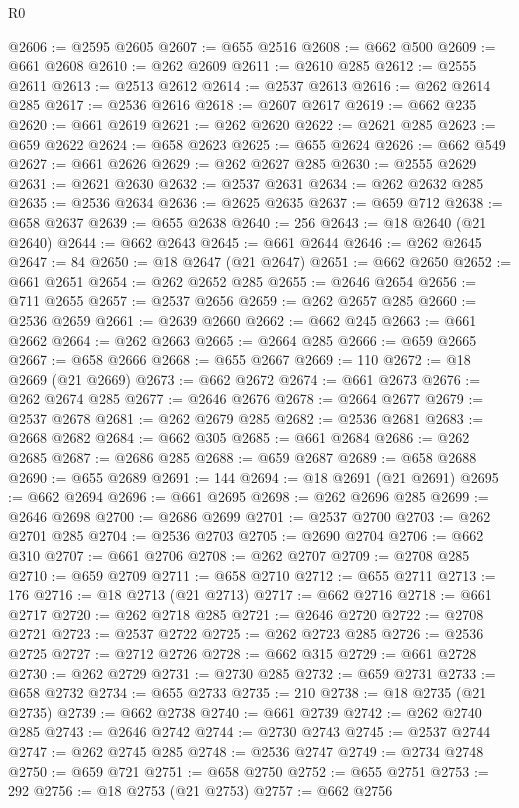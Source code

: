 \begin{lexlean}{R0}
\begin{coremodule}
@2606 := @2595 @2605
@2607 := @655 @2516
@2608 := @662 @500
@2609 := @661 @2608
@2610 := @262 @2609
@2611 := @2610 @285
@2612 := @2555 @2611
@2613 := @2513 @2612
@2614 := @2537 @2613
@2616 := @262 @2614 @285
@2617 := @2536 @2616
@2618 := @2607 @2617
@2619 := @662 @235
@2620 := @661 @2619
@2621 := @262 @2620
@2622 := @2621 @285
@2623 := @659 @2622
@2624 := @658 @2623
@2625 := @655 @2624
@2626 := @662 @549
@2627 := @661 @2626
@2629 := @262 @2627 @285
@2630 := @2555 @2629
@2631 := @2621 @2630
@2632 := @2537 @2631
@2634 := @262 @2632 @285
@2635 := @2536 @2634
@2636 := @2625 @2635
@2637 := @659 @712
@2638 := @658 @2637
@2639 := @655 @2638
@2640 := 256
@2643 := @18 @2640 (@21 @2640)
@2644 := @662 @2643
@2645 := @661 @2644
@2646 := @262 @2645
@2647 := 84
@2650 := @18 @2647 (@21 @2647)
@2651 := @662 @2650
@2652 := @661 @2651
@2654 := @262 @2652 @285
@2655 := @2646 @2654
@2656 := @711 @2655
@2657 := @2537 @2656
@2659 := @262 @2657 @285
@2660 := @2536 @2659
@2661 := @2639 @2660
@2662 := @662 @245
@2663 := @661 @2662
@2664 := @262 @2663
@2665 := @2664 @285
@2666 := @659 @2665
@2667 := @658 @2666
@2668 := @655 @2667
@2669 := 110
@2672 := @18 @2669 (@21 @2669)
@2673 := @662 @2672
@2674 := @661 @2673
@2676 := @262 @2674 @285
@2677 := @2646 @2676
@2678 := @2664 @2677
@2679 := @2537 @2678
@2681 := @262 @2679 @285
@2682 := @2536 @2681
@2683 := @2668 @2682
@2684 := @662 @305
@2685 := @661 @2684
@2686 := @262 @2685
@2687 := @2686 @285
@2688 := @659 @2687
@2689 := @658 @2688
@2690 := @655 @2689
@2691 := 144
@2694 := @18 @2691 (@21 @2691)
@2695 := @662 @2694
@2696 := @661 @2695
@2698 := @262 @2696 @285
@2699 := @2646 @2698
@2700 := @2686 @2699
@2701 := @2537 @2700
@2703 := @262 @2701 @285
@2704 := @2536 @2703
@2705 := @2690 @2704
@2706 := @662 @310
@2707 := @661 @2706
@2708 := @262 @2707
@2709 := @2708 @285
@2710 := @659 @2709
@2711 := @658 @2710
@2712 := @655 @2711
@2713 := 176
@2716 := @18 @2713 (@21 @2713)
@2717 := @662 @2716
@2718 := @661 @2717
@2720 := @262 @2718 @285
@2721 := @2646 @2720
@2722 := @2708 @2721
@2723 := @2537 @2722
@2725 := @262 @2723 @285
@2726 := @2536 @2725
@2727 := @2712 @2726
@2728 := @662 @315
@2729 := @661 @2728
@2730 := @262 @2729
@2731 := @2730 @285
@2732 := @659 @2731
@2733 := @658 @2732
@2734 := @655 @2733
@2735 := 210
@2738 := @18 @2735 (@21 @2735)
@2739 := @662 @2738
@2740 := @661 @2739
@2742 := @262 @2740 @285
@2743 := @2646 @2742
@2744 := @2730 @2743
@2745 := @2537 @2744
@2747 := @262 @2745 @285
@2748 := @2536 @2747
@2749 := @2734 @2748
@2750 := @659 @721
@2751 := @658 @2750
@2752 := @655 @2751
@2753 := 292
@2756 := @18 @2753 (@21 @2753)
@2757 := @662 @2756

\end{coremodule}
\end{lexlean}

